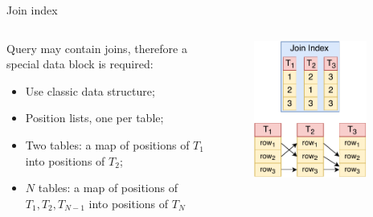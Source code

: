 \documentclass[compress, dvipsnames, unicode]{beamer}
\begin{document}
\begin{frame}{Join index}
\begin{columns}
	\begin{column}{0.52\textwidth}
	    Query may contain joins, therefore a special data block is required:
        \vspace{0.5em}
        
		\begin{itemize}
		\setlength\itemsep{1em}
			\item Use classic data structure;
			\item Position lists, one per table;
			\item Two tables: a map of positions of $T_1$ into positions of $T_2$;
			\item $N$ tables: a map of positions of $T_1, T_2, T_{N-1}$ into positions of $T_N$
		\end{itemize}	
	\end{column}%
	\begin{column}{0.43\textwidth}
	\begin{figure}
	    \includegraphics[width=0.9\textwidth]{images/join_index.pdf}
	\end{figure}
	\end{column}
\end{columns}	
\end{frame}
\end{document}
